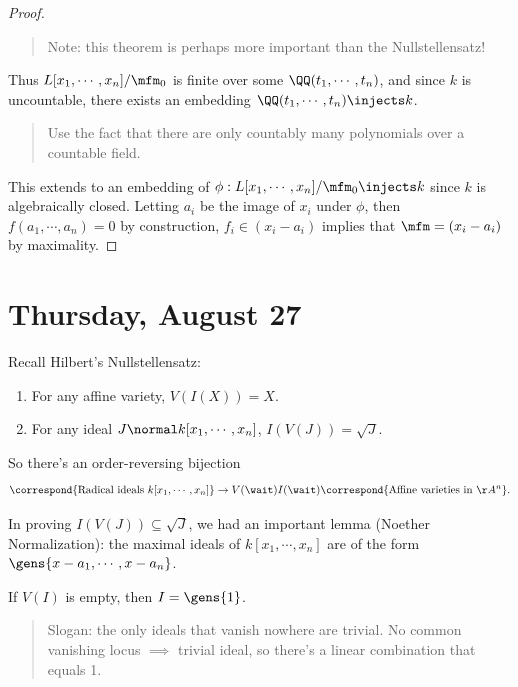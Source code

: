 \begin{proof}
\begin{theorem}
\end{theorem}

\begin{quote}
Note: this theorem is perhaps more important than the Nullstellensatz!
\end{quote}

Thus \(L[x_1, \cdots, x_n]/\mfm_0\) is finite over some
\(\QQ(t_1, \cdots, t_n)\), and since \(k\) is uncountable, there exists
an embedding \(\QQ(t_1, \cdots, t_n) \injects k\).

\begin{quote}
Use the fact that there are only countably many polynomials over a
countable field.
\end{quote}

This extends to an embedding of
\(\phi: L[x_1, \cdots, x_n]/\mfm_0 \injects k\) since \(k\) is
algebraically closed. Letting \(a_i\) be the image of \(x_i\) under
\(\phi\), then \(f(a_1, \cdots, a_n) = 0\) by construction,
\(f_i \in (x_i - a_i)\) implies that \(\mfm = (x_i - a_i)\) by
maximality.

\end{proof}

\hypertarget{thursday-august-27}{%
\section{Thursday, August 27}\label{thursday-august-27}}

Recall Hilbert's Nullstellensatz:

\begin{enumerate}
\def\labelenumi{\alph{enumi}.}
\item
  For any affine variety, \(V(I(X)) = X\).
\item
  For any ideal \(J\normal k[x_1, \cdots, x_n]\),
  \(I(V(J)) = \sqrt{J}\).
\end{enumerate}

So there's an order-reversing bijection
\begin{align*}  
\correspond{\text{Radical ideals } k[x_1, \cdots, x_n]} \to{V(\wait)}{I(\wait)}
\correspond{\text{Affine varieties in } \AA^n}
.\end{align*}

In proving \(I(V(J)) \subseteq \sqrt{J}\), we had an important lemma
(Noether Normalization): the maximal ideals of \(k[x_1, \cdots, x_n]\)
are of the form \(\gens{x-a_1, \cdots, x-a_n}\).

\begin{corollary}[?]

If \(V(I)\) is empty, then \(I = \gens{1}\).

\begin{quote}
Slogan: the only ideals that vanish nowhere are trivial. No common
vanishing locus \(\implies\) trivial ideal, so there's a linear
combination that equals 1.
\end{quote}

\end{corollary}

